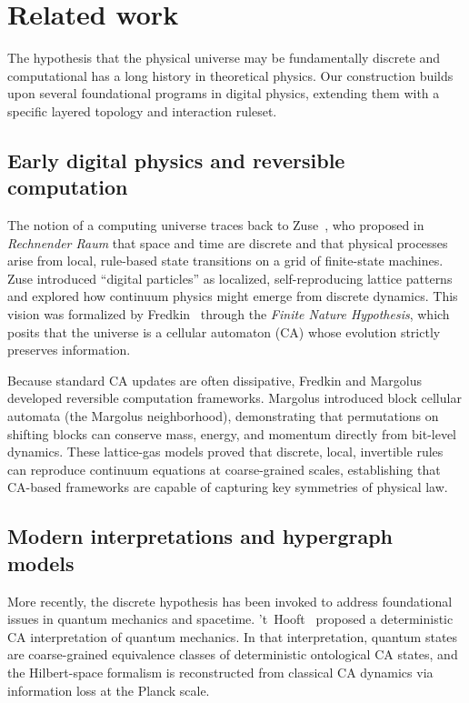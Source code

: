 \documentclass{ijuc}
\begin{document}
\section{Related work}
\label{sec:related-work}

The hypothesis that the physical universe may be fundamentally discrete and computational has a long history in theoretical physics. Our construction builds upon several foundational programs in digital physics, extending them with a specific layered topology and interaction ruleset.

\subsection*{Early digital physics and reversible computation}
The notion of a computing universe traces back to Zuse~\cite{zuse}, who proposed in \emph{Rechnender Raum} that space and time are discrete and that physical processes arise from local, rule-based state transitions on a grid of finite-state machines. Zuse introduced ``digital particles'' as localized, self-reproducing lattice patterns and explored how continuum physics might emerge from discrete dynamics. This vision was formalized by Fredkin~\cite{fredkin} through the \emph{Finite Nature Hypothesis}, which posits that the universe is a cellular automaton (CA) whose evolution strictly preserves information. 

Because standard CA updates are often dissipative, Fredkin and Margolus~\cite{margolus} developed reversible computation frameworks. Margolus introduced block cellular automata (the Margolus neighborhood), demonstrating that permutations on shifting blocks can conserve mass, energy, and momentum directly from bit-level dynamics. These lattice-gas models proved that discrete, local, invertible rules can reproduce continuum equations at coarse-grained scales, establishing that CA-based frameworks are capable of capturing key symmetries of physical law.

\subsection*{Modern interpretations and hypergraph models}
More recently, the discrete hypothesis has been invoked to address foundational issues in quantum mechanics and spacetime. 't~Hooft~\cite{thooft} proposed a deterministic CA interpretation of quantum mechanics.  In that interpretation, quantum states are coarse-grained equivalence classes of deterministic ontological CA states, and the Hilbert-space formalism is reconstructed from classical CA dynamics via information loss at the Planck scale. 
\end{document}
